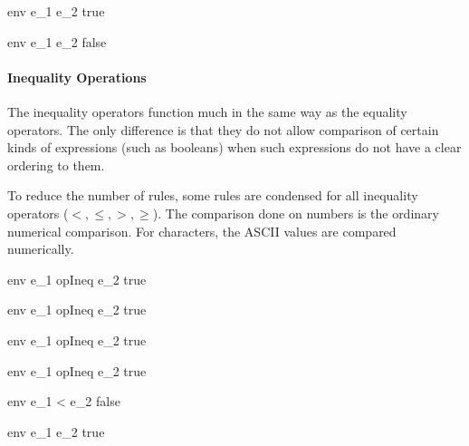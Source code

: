 \documentclass{article}
\begin{document}
\bigskip

    {\mbox{env} \vdash e_1 \neq e_2 \Downarrow true}

    {\mbox{env} \vdash e_1 \neq e_2 \Downarrow false}

\bigskip

\paragraph{Inequality Operations}
The inequality operators function much in the same way as the equality operators.
The only difference is that they do not allow comparison of certain kinds of expressions (such as booleans) when such expressions do not have a clear ordering to them.

To reduce the number of rules, some rules are condensed for all inequality operators ($<, \leq, >, \geq$).
The comparison done on numbers is the ordinary numerical comparison.
For characters, the ASCII values are compared numerically.

    {\mbox{env} \vdash e_1 \; opIneq \; e_2 \Downarrow true}

    {\mbox{env} \vdash e_1 \; opIneq \; e_2 \Downarrow true}

\medskip

    {\mbox{env} \vdash e_1 \; opIneq \; e_2 \Downarrow true}

    {\mbox{env} \vdash e_1 \; opIneq \; e_2 \Downarrow true}

\medskip

    {\mbox{env} \vdash e_1 < e_2 \Downarrow false}

    {\mbox{env} \vdash e_1 \leq e_2 \Downarrow true}
\end{document}
